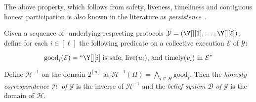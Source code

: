 The above property, which follows from safety, liveness, timeliness and
contiguous honest participation is also known in the literature as
\emph{persistence}~\cite{backbone}.

\begin{definition}
  Given a sequence of \rollerblade-underlying-respecting
  protocols $\mathcal{Y} = (\Y[][1], \ldots, \Y[][\ell])$,
  define for each $i \in [\ell]$ the following predicate on
  a collective execution $\mathcal{E}$ of $\mathcal{Y}$:

  \[
    \text{good}_i(\mathcal{E}) = \text{``} \Y[][i] \text{ is safe, live$(u_i)$, and timely$(v_i)$ in $\mathcal{E}$''}
  \]

  Define $\mathcal{H}^{-1}$ on the domain $2^{[n]}$ as
  $\mathcal{H}^{-1}(H) = \bigwedge_{i \subseteq H} \text{good}_i$.
  Then the \emph{\rollerblade honesty correspondence $\mathcal{H}$ of $\mathcal{Y}$}
  is the inverse of $\mathcal{H}^{-1}$ and the \emph{\rollerblade belief system
  $\mathcal{B}$ of $\mathcal{Y}$} is the domain of $\mathcal{H}$.
\end{definition}


